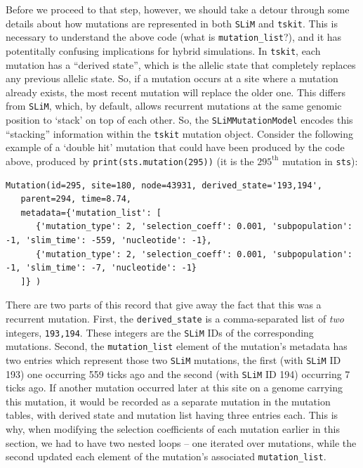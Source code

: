 \documentclass[12pt]{article}
\newcommand{\tskit}[0]{\texttt{tskit}\xspace}
\newcommand{\slim}[0]{\texttt{SLiM}\xspace}
\begin{document}
Before we proceed to that step, however, we should take a detour through
some details about how mutations are represented in both \slim and \tskit. 
This is necessary to understand the above code (what is \verb|mutation_list|?),
and it has potentitally confusing implications for hybrid simulations. 
In \tskit, each mutation has a ``derived state'', which is the allelic state that completely replaces any previous allelic state.
So, if a mutation occurs at a site where a mutation already exists,
the most recent mutation will replace the older one.
This differs from \slim, which, by default, allows recurrent mutations at the same genomic
position to `stack' on top of each other.
So, the \verb|SLiMMutationModel| encodes this ``stacking'' information within the \tskit mutation object.
Consider the following example of a `double hit' mutation
that could have been produced by the code above, produced by \verb|print(sts.mutation(295))|
(it is the $295^\text{th}$ mutation in \verb|sts|):
\begin{verbatim}
Mutation(id=295, site=180, node=43931, derived_state='193,194',
   parent=294, time=8.74,
   metadata={'mutation_list': [
      {'mutation_type': 2, 'selection_coeff': 0.001, 'subpopulation': -1, 'slim_time': -559, 'nucleotide': -1},
      {'mutation_type': 2, 'selection_coeff': 0.001, 'subpopulation': -1, 'slim_time': -7, 'nucleotide': -1}
   ]} )
\end{verbatim}
There are two parts of this record that give away the fact that this was a recurrent mutation.
First, the \verb|derived_state| is a comma-separated list of \emph{two} integers, \verb|193,194|.
These integers are the \slim IDs of the corresponding mutations.
Second, the \verb|mutation_list| element of the mutation's metadata has two entries which represent those two \slim mutations,
the first (with \slim ID 193) one occurring 559 ticks ago and the second (with \slim ID 194)  occurring 7 ticks ago.
If another mutation occurred later at this site on a genome carrying this mutation,
it would be recorded as a separate mutation in the mutation tables,
with derived state and mutation list having three entries each.
This is why, when modifying
the selection coefficients of each mutation earlier in this section, we had to have two nested loops --
one iterated over mutations,
while the second updated each element of the mutation's associated \verb|mutation_list|.
\end{document}
